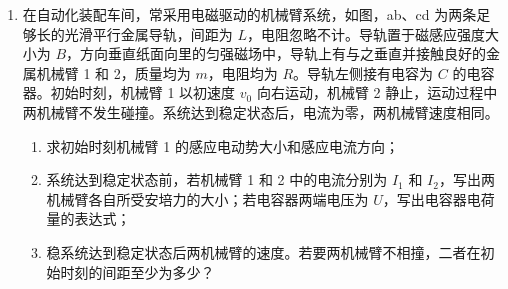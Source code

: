 \documentclass[\gkver]{gaokaozhenti}
\begin{document}
\begin{enumerate}
{在垂直杆方向，当 $F\sin \theta = mg\cos \theta$ 时，$t = 4 \Us$

则 $0 \sim 4 \Us$，垂直杆方向 $F\sin \theta + N = mg\cos \theta$

摩擦力 $f = \mu N = \frac{\sqrt{3}}{3}\left( \frac{3}{2}mg - \frac{3}{8}mgt \right) = \left( \frac{1}{2} - \frac{1}{8}t \right)mg$（$0 \leq t \leq 4$）

在 $4 \sim 6 \Us$ 内，垂直杆方向 $F\sin \theta = mg\cos \theta + N$

摩擦力 $f = \mu N = \frac{\sqrt{3}}{3}\left( \frac{3}{8}mgt - \frac{3}{2}mg \right) = \left( \frac{1}{8}t - \frac{1}{2} \right)mg$（$4 \leq t \leq 6$）

相应的 $f-t$ 图像如图


（3）在 $0 \sim 6 \Us$ 内沿杆方向根据动量定理有 $I_{F}\cos \theta - I_{f} + mg\sin \theta \times t = mv$

在 $0 \sim 6 \Us$ 内摩擦力的冲量为 $f-t$ 图围成的面积，则 $I_{f} = \frac{1}{2} \times \frac{1}{2}mg \times 4 + \frac{1}{2} \times \frac{1}{4}mg \times 2 = \frac{5}{4}mg$

联立有 $\frac{9\sqrt{3}}{2}mg \cdot \cos 30\Udu + 3mg - \frac{5}{4}mg = mv$

可得 $v = \frac{17}{2}g$
}

\item
在自动化装配车间，常采用电磁驱动的机械臂系统，如图，ab、cd 为两条足够长的光滑平行金属导轨，间距为 $L$，电阻忽略不计。导轨置于磁感应强度大小为 $B$，方向垂直纸面向里的匀强磁场中，导轨上有与之垂直并接触良好的金属机械臂 1 和 2，质量均为 $m$，电阻均为 $R$。导轨左侧接有电容为 $C$ 的电容器。初始时刻，机械臂 1 以初速度 $v_{0}$ 向右运动，机械臂 2 静止，运动过程中两机械臂不发生碰撞。系统达到稳定状态后，电流为零，两机械臂速度相同。

\begin{enumerate}
\item
求初始时刻机械臂 1 的感应电动势大小和感应电流方向；
\item
系统达到稳定状态前，若机械臂 1 和 2 中的电流分别为 $I_{1}$ 和 $I_{2}$，写出两机械臂各自所受安培力的大小；若电容器两端电压为 $U$，写出电容器电荷量的表达式；
\item
稳系统达到稳定状态后两机械臂的速度。若要两机械臂不相撞，二者在初始时刻的间距至少为多少？
\end{enumerate}


\end{enumerate}
\end{document}
